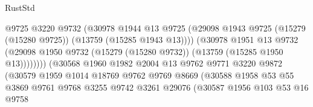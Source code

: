 \begin{lexlean}{RustStd}
\begin{coremodule}
                                          @9725
                                          @3220
                                          @9732
                                          (@30978
                                            @1944
                                            @13
                                            @9725
                                            (@29098
                                              @1943
                                              @9725
                                              (@15279 (@15280 @9725))
                                              (@13759 (@15285 @1943 @13))))
                                          (@30978
                                            @1951
                                            @13
                                            @9732
                                            (@29098
                                              @1950
                                              @9732
                                              (@15279 (@15280 @9732))
                                              (@13759 (@15285 @1950 @13))))))))
                                  (@30568
                                    @1960
                                    @1982
                                    @2004
                                    @13
                                    @9762
                                    @9771
                                    @3220
                                    @9872
                                    (@30579
                                      @1959
                                      @1014
                                      @18769
                                      @9762
                                      @9769
                                      @8669
                                      (@30588
                                        @1958
                                        @53
                                        @55
                                        @3869
                                        @9761
                                        @9768
                                        @3255
                                        @9742
                                        @3261
                                        @29076
                                        (@30587
                                          @1956
                                          @103
                                          @53
                                          @16
                                          @9758

\end{coremodule}
\end{lexlean}
